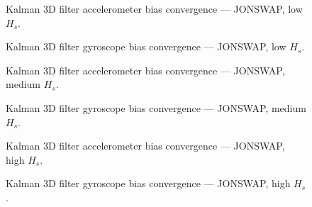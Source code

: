 \documentclass[11pt,letterpaper]{article}
\begin{document}
\begin{figure}[H]\centering
  \resizebox{\textwidth}{!}{}
  \caption{Kalman 3D filter accelerometer bias convergence — JONSWAP, low $H_s$.}
  \label{fig:w3d_jonswap_low_acc_bias}
\end{figure}

\begin{figure}[H]\centering
  \resizebox{\textwidth}{!}{}
  \caption{Kalman 3D filter gyroscope bias convergence — JONSWAP, low $H_s$.}
  \label{fig:w3d_jonswap_low_gyro_bias}
\end{figure}

\begin{figure}[H]\centering
  \resizebox{\textwidth}{!}{}
  \caption{Kalman 3D filter accelerometer bias convergence — JONSWAP, medium $H_s$.}
  \label{fig:w3d_jonswap_medium_acc_bias}
\end{figure}

\begin{figure}[H]\centering
  \resizebox{\textwidth}{!}{}
  \caption{Kalman 3D filter gyroscope bias convergence — JONSWAP, medium $H_s$.}
  \label{fig:w3d_jonswap_medium_gyro_bias}
\end{figure}

\begin{figure}[H]\centering
  \resizebox{\textwidth}{!}{}
  \caption{Kalman 3D filter accelerometer bias convergence — JONSWAP, high $H_s$.}
  \label{fig:w3d_jonswap_high_acc_bias}
\end{figure}

\begin{figure}[H]\centering
  \resizebox{\textwidth}{!}{}
  \caption{Kalman 3D filter gyroscope bias convergence — JONSWAP, high $H_s$.}
  \label{fig:w3d_jonswap_high_gyro_bias}
\end{figure}

\usepackage{makecell} %
\end{document}
